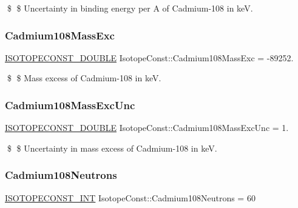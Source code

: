 \$ \$ Uncertainty in binding energy per A of Cadmium-\/108 in keV. \mbox{\label{group___isotope_const-_cadmium-_cd108_gaa2db459dc4b92c1cdd89e5a7cf1d536f}} 
\subsubsection{\texorpdfstring{Cadmium108\+Mass\+Exc}{Cadmium108MassExc}}
{\footnotesize\ttfamily \mbox{\hyperlink{group___isotope_const-_macros_ga8f45a7272ce02c0b4c65c44636ed719a}{I\+S\+O\+T\+O\+P\+E\+C\+O\+N\+S\+T\+\_\+\+D\+O\+U\+B\+LE}} Isotope\+Const\+::\+Cadmium108\+Mass\+Exc = -\/89252.}

\$ \$ Mass excess of Cadmium-\/108 in keV. \mbox{\label{group___isotope_const-_cadmium-_cd108_ga7183dadc92db5611fdd9f891478168bd}} 
\subsubsection{\texorpdfstring{Cadmium108\+Mass\+Exc\+Unc}{Cadmium108MassExcUnc}}
{\footnotesize\ttfamily \mbox{\hyperlink{group___isotope_const-_macros_ga8f45a7272ce02c0b4c65c44636ed719a}{I\+S\+O\+T\+O\+P\+E\+C\+O\+N\+S\+T\+\_\+\+D\+O\+U\+B\+LE}} Isotope\+Const\+::\+Cadmium108\+Mass\+Exc\+Unc = 1.}

\$ \$ Uncertainty in mass excess of Cadmium-\/108 in keV. \mbox{\label{group___isotope_const-_cadmium-_cd108_gaa167105dfa4329f5e0b6fc468e3c8907}} 
\subsubsection{\texorpdfstring{Cadmium108\+Neutrons}{Cadmium108Neutrons}}
{\footnotesize\ttfamily \mbox{\hyperlink{group___isotope_const-_macros_ga5f18360b3e99483a35c32d789e62621c}{I\+S\+O\+T\+O\+P\+E\+C\+O\+N\+S\+T\+\_\+\+I\+NT}} Isotope\+Const\+::\+Cadmium108\+Neutrons = 60}


